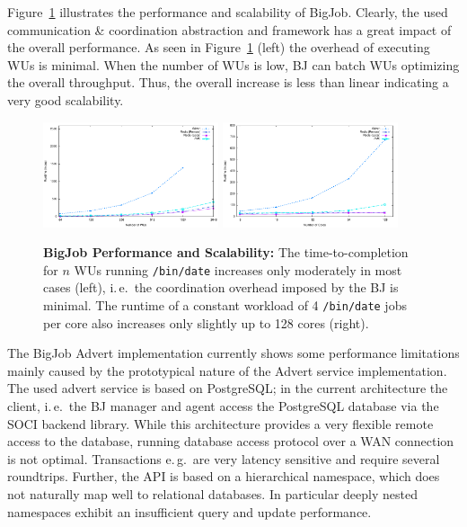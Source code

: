 \documentclass[conference,final]{IEEEtran}
\begin{document}
Figure~\ref{fig:perf_bigjob-varying-wus} illustrates the performance and 
scalability of BigJob. Clearly, the used communication \& coordination 
abstraction and framework has a great impact of the overall performance. As 
seen in Figure~\ref{fig:perf_bigjob-varying-wus} (left) the overhead of 
executing WUs is minimal. When the number of WUs is low, BJ can batch WUs optimizing the overall throughput.  Thus, the overall increase is less than linear indicating a very good scalability.

\begin{figure}[htbp] \centering
\includegraphics[width=0.46\textwidth]{perf/bigjob-varying-wus-alamo.pdf}\qquad
\includegraphics[width=0.46\textwidth]{perf/bigjob-varying-cores-alamo.pdf}
\caption{\textbf{BigJob Performance and Scalability:} The time-to-completion
for $n$ WUs running \texttt{/bin/date} increases only moderately in most cases
(left), i.\,e.\ the coordination overhead imposed by the BJ is minimal. The
runtime of a constant workload of 4 \texttt{/bin/date} jobs per core also
increases only slightly up to 128 cores (right). }
\label{fig:perf_bigjob-varying-wus} \end{figure}

The BigJob Advert implementation currently shows some performance limitations
mainly caused by the prototypical nature of the Advert service implementation.
The used advert service is based on PostgreSQL; in the current architecture
the client, i.\,e.\ the BJ manager and agent access the PostgreSQL database
via the SOCI backend library. While this architecture provides a very flexible
remote access to the database, running database access protocol over a WAN
connection is not optimal. Transactions e.\,g.\ are very latency sensitive and
require several roundtrips. Further, the API is based on a hierarchical 
namespace, which does not naturally map well to relational databases. In 
particular deeply nested namespaces exhibit an insufficient query and update 
performance.
\end{document}
